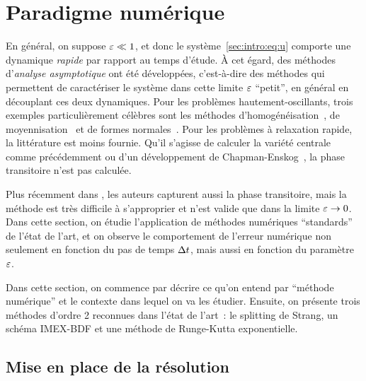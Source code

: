 \section*{Paradigme numérique}

En général, on suppose $\varepsilon \ll 1$, et donc le système~\eqref{sec:intro:eq:u} comporte une dynamique \textit{rapide} par rapport au temps d'étude. À cet égard, des méthodes d'\textit{analyse asymptotique} ont été développées, c'est-à-dire des méthodes qui permettent de caractériser le système dans cette limite $\varepsilon$ \enquote{petit}, en général en découplant ces deux dynamiques. Pour les problèmes hautement-oscillants, trois exemples particulièrement célèbres sont les méthodes d'homogénéisation~\cite{goudon.2003.homogenization}, de moyennisation~\cite{perko.1969.higher,sanders.2007.averaging,lochak.1988.multiphase} et de formes normales~\cite{murdock.2006.normal,bambusi.2003.birkhoff}. Pour les problèmes à relaxation rapide, la littérature est moins fournie. Qu'il s'agisse de calculer la variété centrale comme précédemment ou d'un développement de Chapman-Enskog~\cite{santos.1986.divergence,degond.2004.macroscopic,chartier.2015.uniformly}, la phase transitoire n'est pas calculée. 

Plus récemment dans \cite{castella.2016.formal}, les auteurs capturent aussi la phase transitoire, mais la méthode est très difficile à s'approprier et n'est valide que dans la limite $\varepsilon \rightarrow 0$. Dans cette section, on étudie l'application de méthodes numériques \enquote{standards} de l'état de l'art, et on observe le comportement de l'erreur numérique non seulement en fonction du pas de temps $\Delta t$, mais aussi en fonction du paramètre $\varepsilon$. 

Dans cette section, on commence par décrire ce qu'on entend par \enquote{méthode numérique} et le contexte dans lequel on va les étudier. Ensuite, on présente trois méthodes d'ordre 2 reconnues dans l'état de l'art~: le splitting de Strang, un schéma IMEX-BDF et une méthode de Runge-Kutta exponentielle. 



\subsection*{Mise en place de la résolution}

